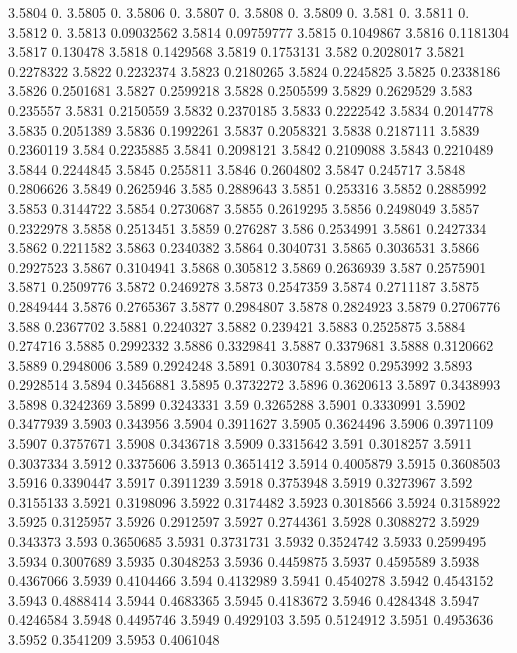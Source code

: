 3.5804  0.
3.5805  0.
3.5806  0.
3.5807  0.
3.5808  0.
3.5809  0.
3.581  0.
3.5811  0.
3.5812  0.
3.5813  0.09032562
3.5814  0.09759777
3.5815  0.1049867
3.5816  0.1181304
3.5817  0.130478
3.5818  0.1429568
3.5819  0.1753131
3.582  0.2028017
3.5821  0.2278322
3.5822  0.2232374
3.5823  0.2180265
3.5824  0.2245825
3.5825  0.2338186
3.5826  0.2501681
3.5827  0.2599218
3.5828  0.2505599
3.5829  0.2629529
3.583  0.235557
3.5831  0.2150559
3.5832  0.2370185
3.5833  0.2222542
3.5834  0.2014778
3.5835  0.2051389
3.5836  0.1992261
3.5837  0.2058321
3.5838  0.2187111
3.5839  0.2360119
3.584  0.2235885
3.5841  0.2098121
3.5842  0.2109088
3.5843  0.2210489
3.5844  0.2244845
3.5845  0.255811
3.5846  0.2604802
3.5847  0.245717
3.5848  0.2806626
3.5849  0.2625946
3.585  0.2889643
3.5851  0.253316
3.5852  0.2885992
3.5853  0.3144722
3.5854  0.2730687
3.5855  0.2619295
3.5856  0.2498049
3.5857  0.2322978
3.5858  0.2513451
3.5859  0.276287
3.586  0.2534991
3.5861  0.2427334
3.5862  0.2211582
3.5863  0.2340382
3.5864  0.3040731
3.5865  0.3036531
3.5866  0.2927523
3.5867  0.3104941
3.5868  0.305812
3.5869  0.2636939
3.587  0.2575901
3.5871  0.2509776
3.5872  0.2469278
3.5873  0.2547359
3.5874  0.2711187
3.5875  0.2849444
3.5876  0.2765367
3.5877  0.2984807
3.5878  0.2824923
3.5879  0.2706776
3.588  0.2367702
3.5881  0.2240327
3.5882  0.239421
3.5883  0.2525875
3.5884  0.274716
3.5885  0.2992332
3.5886  0.3329841
3.5887  0.3379681
3.5888  0.3120662
3.5889  0.2948006
3.589  0.2924248
3.5891  0.3030784
3.5892  0.2953992
3.5893  0.2928514
3.5894  0.3456881
3.5895  0.3732272
3.5896  0.3620613
3.5897  0.3438993
3.5898  0.3242369
3.5899  0.3243331
3.59  0.3265288
3.5901  0.3330991
3.5902  0.3477939
3.5903  0.343956
3.5904  0.3911627
3.5905  0.3624496
3.5906  0.3971109
3.5907  0.3757671
3.5908  0.3436718
3.5909  0.3315642
3.591  0.3018257
3.5911  0.3037334
3.5912  0.3375606
3.5913  0.3651412
3.5914  0.4005879
3.5915  0.3608503
3.5916  0.3390447
3.5917  0.3911239
3.5918  0.3753948
3.5919  0.3273967
3.592  0.3155133
3.5921  0.3198096
3.5922  0.3174482
3.5923  0.3018566
3.5924  0.3158922
3.5925  0.3125957
3.5926  0.2912597
3.5927  0.2744361
3.5928  0.3088272
3.5929  0.343373
3.593  0.3650685
3.5931  0.3731731
3.5932  0.3524742
3.5933  0.2599495
3.5934  0.3007689
3.5935  0.3048253
3.5936  0.4459875
3.5937  0.4595589
3.5938  0.4367066
3.5939  0.4104466
3.594  0.4132989
3.5941  0.4540278
3.5942  0.4543152
3.5943  0.4888414
3.5944  0.4683365
3.5945  0.4183672
3.5946  0.4284348
3.5947  0.4246584
3.5948  0.4495746
3.5949  0.4929103
3.595  0.5124912
3.5951  0.4953636
3.5952  0.3541209
3.5953  0.4061048
